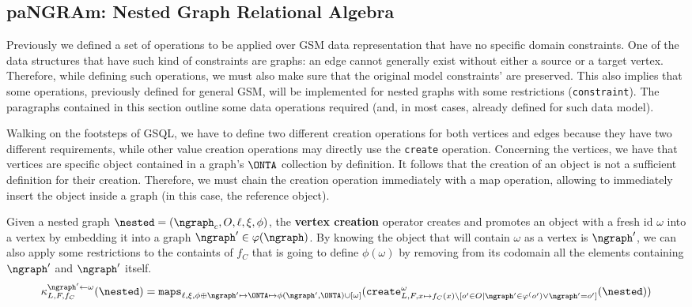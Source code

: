 




\subsection{paNGRAm: Nested Graph Relational Algebra}\label{ssec:ngrahop}
Previously we defined a set of operations to be applied over GSM data representation that have no specific domain constraints. One of the data structures that have such kind of constraints are graphs: an edge cannot generally exist without either a source or a target vertex. Therefore, while defining such operations, we must also make sure that the original model constraints' are preserved. This also implies that some operations, previously defined for general GSM, will be implemented for nested graphs with some restrictions (\texttt{constraint}). The paragraphs contained in this section outline some data operations required (and, in most cases, already defined for such data model).

Walking on the footsteps of GSQL, we have to define two different creation operations for both vertices and edges because they have two different requirements, while other value creation operations may directly use the \texttt{create} operation. Concerning the vertices, we have that vertices are specific object contained in a graph's $\ONTA$ collection by definition. It follows that the creation of an object is not a sufficient definition for their creation. Therefore, we must chain the creation operation immediately with a map operation, allowing to immediately insert the object inside a graph (in this case, the reference object).

\begin{definition}
	Given a nested graph $\nested=(\ngraph_c,O,\ell,\xi,\phi)$, the \textbf{vertex creation} operator creates and promotes an object with a fresh id $\omega$ into a vertex by embedding it into a graph $\ngraph'\in\varphi(\ngraph)$. By knowing the object that will contain $\omega$ as a vertex is $\ngraph'$, we can also apply some restrictions to the containts of $f_C$ that is going to define $\phi(\omega)$ by removing from its codomain all the elements containing $\ngraph'$ and $\ngraph'$ itself.
	\[\kappa^{\ngraph'\leftarrow \omega}_{L,F,f_C}(\nested)=\texttt{maps}_{\ell,\xi,\phi\oplus \ngraph'\mapsto\ONTA\mapsto \phi(\ngraph',\ONTA)\cup[\omega]}(\texttt{create}^\omega_{L,F,x\mapsto f_C(x)\backslash[o'\in O|\ngraph'\in \varphi^(o')\vee \ngraph'=o']}(\nested))\]
\end{definition}

